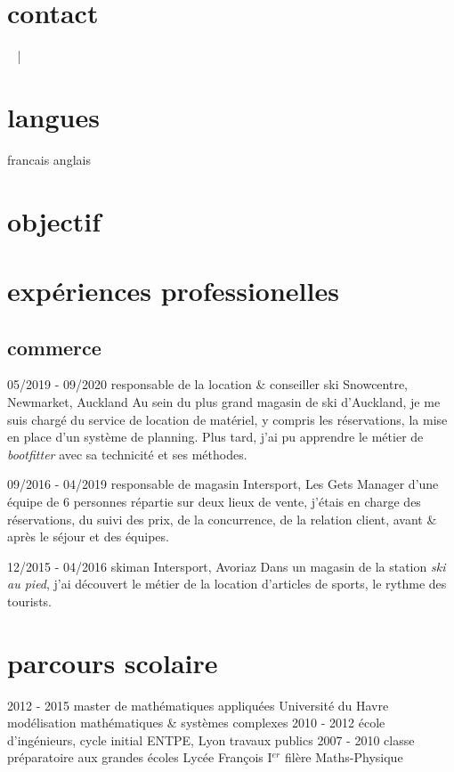 \documentclass[]{farangoth-cv}
\begin{document}
\makeheader{}

\begin{aside}
  \section{contact}\label{sec:about}
  \myPhoneNumber{}
  ~
  \href{mailto:\myMail{}}{\myMail{}}
  \href{\myGithub}{} | \href{\myLinkedin}{}
  ~
  \myAddress{}

  \section{langues}
  francais
  anglais
\end{aside}

\section{objectif}
\lipsum[2]

\section{expériences professionelles}
\subsection{commerce}
\begin{entrylist}
  \entry%
  {05/2019 \-- 09/2020}
  {responsable de la location \& conseiller ski}
  {Snowcentre, Newmarket, Auckland}
  {
    Au sein du plus grand magasin de ski d'Auckland, je me suis chargé du service de location de matériel, y compris les réservations, la mise en place d'un système de planning. Plus tard, j'ai pu apprendre le métier de \emph{bootfitter} avec sa technicité et ses méthodes.
  }
  
  \entry%
  {09/2016 \-- 04/2019}
  {responsable de magasin}
  {Intersport, Les Gets}
  {
    Manager d'une équipe de 6 personnes répartie sur deux lieux de vente, j'étais en charge des réservations, du suivi des prix, de la concurrence, de la relation client, avant \& après le séjour et des équipes.
  }

  \entry%
  {12/2015 \-- 04/2016}
  {skiman}
  {Intersport, Avoriaz}
  {
    Dans un magasin de la station \emph{ski au pied}, j'ai découvert le métier de la location d'articles de sports, le rythme des tourists.
  }
\end{entrylist}

\section{parcours scolaire}
\begin{entrylist}
  \entry%
  {2012 \-- 2015}
  {master de mathématiques appliquées}
  {Université du Havre}
  {
    modélisation mathématiques \& systèmes complexes
  }
  \entry%
  {2010 \-- 2012}
  {école d'ingénieurs, cycle initial}
  {ENTPE, Lyon}
  {
    travaux publics
  }
  \entry%
  {2007 \-- 2010}
  {classe préparatoire aux grandes écoles}
  {Lycée François I$^{er}$}
  {
    filère Maths\--Physique
  }
\end{entrylist}
\end{document}
